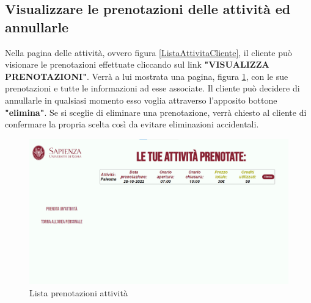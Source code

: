 \documentclass [a4paper, 12pt]{book}
\begin{document}
\subsection{Visualizzare le prenotazioni delle attività ed annullarle}
Nella pagina delle attività, ovvero figura \ref{ListaAttivitaCliente}, il cliente può visionare le prenotazioni effettuate cliccando sul link \textbf{"VISUALIZZA PRENOTAZIONI"}. Verrà a lui mostrata una pagina, figura \ref{PrenotazioniAttivitaCliente},  con le sue prenotazioni e tutte le informazioni ad esse associate. Il cliente può decidere di annullarle in qualsiasi momento esso voglia attraverso l'apposito bottone \textbf{"elimina"}. Se si sceglie di eliminare una prenotazione, verrà chiesto al cliente di confermare la propria scelta così da evitare eliminazioni accidentali.
\begin{figure}[!h]
\centering
\includegraphics[scale=0.3]{PrenotazioniAttivitaCliente.png}
\caption{Lista prenotazioni attività}
\label{PrenotazioniAttivitaCliente}
\end{figure}
\end{document}
